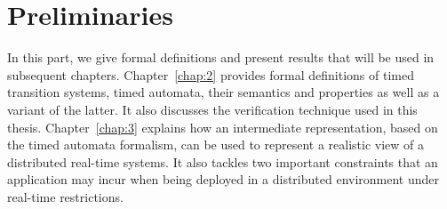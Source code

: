 \documentclass[a4paper,Times,twoside,index,12pt]{Classes/PhDThesisPSnPDF}
\begin{document}
\frontmatter





\begin{titlepage}
  \newpage
  \maketitle
\end{titlepage}

\mainmatter

%
%




\dominitoc
\dominilof
\dominilot
\renewcommand{\baselinestretch}{0.9}\normalsize
\tableofcontents
\renewcommand{\baselinestretch}{1.0}\normalsize





\part{Preliminaries}
{In this part, we give formal definitions and present results that will be used in subsequent
chapters. Chapter~\ref{chap:2} provides formal definitions of timed transition systems,
timed automata, their semantics and properties as well as a variant of the latter.
It also discusses the verification technique used in this thesis. Chapter~\ref{chap:3}
explains how an intermediate representation, based on the timed automata formalism,
can be used to represent a realistic view of a distributed real-time systems. It also tackles
two important constraints that an application may incur when being deployed in a distributed
environment under real-time restrictions.} 


\end{document}
